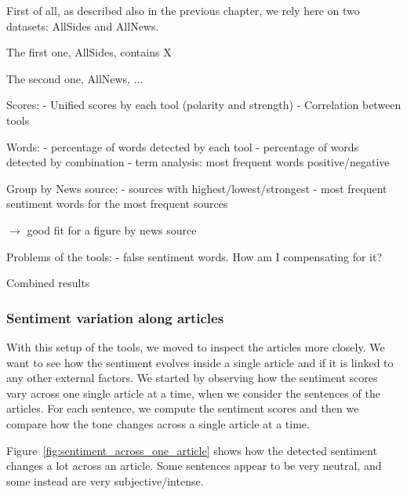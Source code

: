 First of all, as described also in the previous chapter, we rely here on two datasets: AllSides and AllNews.

The first one, AllSides, contains X 

The second one, AllNews, ...

Scores:
- Unified scores by each tool (polarity and strength)
- Correlation between tools

Words:
- percentage of words detected by each tool
- percentage of words detected by combination
- term analysis: most frequent words positive/negative

Group by News source:
- sources with highest/lowest/strongest
- most frequent sentiment words for the most frequent sources

$\rightarrow$ good fit for a figure by news source

Problems of the tools: 
- false sentiment words. How am I compensating for it?

Combined results


\subsubsection{\statusorange Sentiment variation along articles}

With this setup of the tools, we moved to inspect the articles more closely. We want to see how the sentiment evolves inside a single article and if it is linked to any other external factors.
We started by observing how the sentiment scores vary across one single article at a time, when we consider the sentences of the articles. For each sentence, we compute the sentiment scores and then we compare how the tone changes across a single article at a time.

Figure~\ref{fig:sentiment_across_one_article} shows how the detected sentiment changes a lot across an article.
Some sentences appear to be very neutral, and some instead are very subjective/intense.

